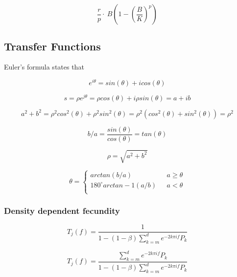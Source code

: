\documentclass[%
nonumbib,      %
%
]{nrc1}                          %
\begin{document}
\begin{equation}\frac{r}{p}\cdot~B(1-(\frac{B}{K})^p)\end{equation}  

\subsection{Transfer Functions}

Euler’s formula states that

\begin{equation} e^{i\theta}=sin(\theta) + icos(\theta) \end{equation}

\begin{equation}
s = \rho e^{j\theta} = \rho cos(\theta) + i\rho sin(\theta) = a + ib
\end{equation}

\begin{equation}
a^2 + b^2 = \rho^2 cos^2(\theta) + \rho^2 sin^2(\theta) = \rho^2 (cos^2(\theta) + sin^2(\theta)) = \rho^2
\end{equation}
       
\begin{equation}
b/a = \frac{sin(\theta)}{cos(\theta)} = tan(\theta)
\end{equation}

\begin{equation}
\rho=\sqrt{a^2+b^2}
\end{equation}


\begin{equation}
\theta = \left\{ \begin{array}{ll}
			arctan(b/a)     	&\mbox{ $a \geq \theta$} \\
			180^\circ arctan-1(a/b) &\mbox{ $a <    \theta$} \\
		\end{array}
       \right.
\end{equation}

\subsubsection{Density dependent fecundity}

\begin{equation}
T_j(f)=\frac{1}{1-(1-\beta)\sum\limits_{k=m}^d e^{-2k\pi if} P_k}
\end{equation}

\begin{equation}
T_j(f)=\frac{\sum\limits_{k=m}^d e^{-2k \pi if} P_k}{1-(1-\beta)\sum\limits_{k=m}^d e^{-2k \pi if} P_k}
\end{equation}
\end{document}
